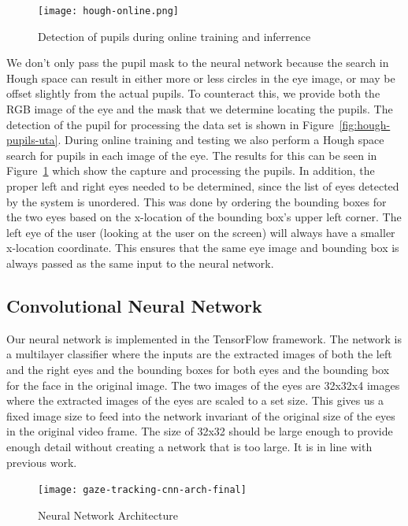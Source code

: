 \documentclass[10pt,twocolumn,letterpaper]{article}
\begin{document}
\begin{figure}[!h]
  \begin{center}
    \texttt{[image: hough-online.png]}
    \caption{Detection of pupils during online training and
      inferrence}
    \label{fig:hough-online}
  \end{center}
\end{figure}

We don't only pass the pupil mask
to the neural network because the search in Hough space can result in
either more or less circles in the eye image, or may be offset
slightly from the actual pupils. To counteract this, we provide both
the RGB image of the eye and the mask that we determine locating the
pupils. The detection of the pupil for processing the data set is shown in
Figure~\ref{fig:hough-pupils-uta}. During online training and testing
we also perform a Hough space search for pupils in each image of the
eye. The results for this can be seen in Figure~\ref{fig:hough-online}
which show the capture and processing the pupils. In addition, the
proper left and right eyes needed to be determined, since the list of eyes
detected by the system is unordered. This was done by
ordering the bounding boxes for the two eyes based on the x-location
of the bounding box's upper left corner. The left eye of the user
(looking at the user on the screen) will always have a smaller
x-location coordinate. This ensures that the same eye image and
bounding box is always passed as the same input to the neural network.

\subsection{Convolutional Neural Network}
Our neural network is implemented in the TensorFlow framework. The
network is a multilayer classifier where the inputs are the extracted
images of both the left and the right eyes and the bounding boxes for
both eyes and the bounding box for the face in the original image. The two images of the
eyes are 32x32x4 images where the extracted images of the eyes are
scaled to a set size. This gives us a fixed image size to feed into
the network invariant of the original size of the eyes in the original
video frame. The size of 32x32 should be large enough to provide
enough detail without creating a network that is too large. It is in
line with previous work. 

\begin{figure}
  \begin{center}
    \texttt{[image: gaze-tracking-cnn-arch-final]}
  \end{center}
  \caption{Neural Network Architecture}
  \label{fig.cnn-arch}
\end{figure}
\end{document}
